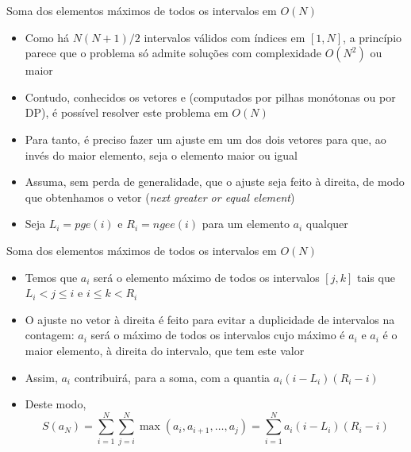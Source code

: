 \begin{frame}[fragile]{Soma dos elementos máximos de todos os intervalos em $O(N)$}

    \begin{itemize}
        \item Como há $N(N + 1)/2$ intervalos válidos com índices em $[1, N]$, a princípio parece que
            o problema só admite soluções com complexidade $O(N^2)$ ou maior

        \item Contudo, conhecidos os vetores  e  (computados por pilhas
            monótonas ou por DP), é possível resolver este problema em $O(N)$

        \item Para tanto, é preciso fazer um ajuste em um dos dois vetores para que, ao invés do 
            maior elemento, seja o elemento maior ou igual

        \item Assuma, sem perda de generalidade, que o ajuste seja feito à direita, de modo que
            obtenhamos o vetor  (\textit{next greater or equal element})

        \item Seja $L_i = pge(i)$ e $R_i = ngee(i)$ para um elemento $a_i$ qualquer
    \end{itemize}
\end{frame}

\begin{frame}[fragile]{Soma dos elementos máximos de todos os intervalos em $O(N)$}

    \begin{itemize}
        \item Temos que $a_i$ será o elemento máximo de todos os intervalos $[j, k]$ tais que
            $L_i < j\leq i$ e $i\leq k < R_i$

        \item O ajuste no vetor à direita é feito para evitar a duplicidade de intervalos na contagem:
            $a_i$ será o máximo de todos os intervalos cujo máximo é $a_i$ e $a_i$ é o maior elemento,
            à direita do intervalo, que tem este valor

        \item Assim, $a_i$ contribuirá, para a soma, com a quantia $a_i(i - L_i)(R_i - i)$

        \item Deste modo,
            $$
                S(a_N) = \sum_{i = 1}^N\sum_{j = i}^N \max(a_i, a_{i+1}, \ldots, a_j) 
                    = \sum_{i = 1}^N a_i(i - L_i)(R_i - i)
            $$
    \end{itemize}

\end{frame}


